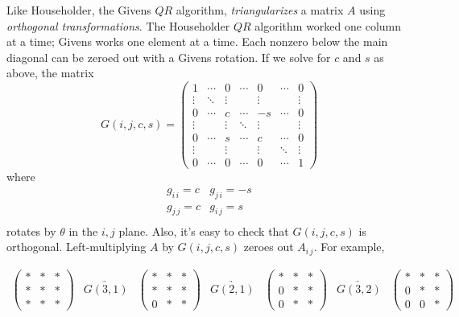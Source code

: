 Like Householder, the Givens $QR$ algorithm, \emph{triangularizes} a matrix $A$ using \emph{orthogonal transformations}.
The Householder $QR$ algorithm worked one column at a time; Givens works one element at a time.
Each nonzero below the main diagonal can be zeroed out with a Givens rotation.
If we solve for $c$ and $s$ as above, the matrix
\begin{equation*}
G(i,j,c,s) = 
\begin{pmatrix}
1   & \cdots & 0 & \cdots & 0 & \cdots & 0 \\
 \vdots & \ddots & \vdots &  & \vdots & & \vdots \\
0   & \cdots &    c   & \cdots &    -s   & \cdots &    0   \\
 \vdots &        & \vdots & \ddots & \vdots &        & \vdots \\
 0   & \cdots &   s   & \cdots &    c   & \cdots &    0   \\
\vdots &        & \vdots &        & \vdots & \ddots & \vdots \\
0   & \cdots &    0   & \cdots &    0   & \cdots &    1 
\end{pmatrix}
\end{equation*}
where
\[ \begin{array}{ll}
g_{i\, i} = c  & g_{j\, i}= -s   \\
g_{j\, j} = c &  g_{i\, j}= s  \\
\end{array}\]
rotates by $\theta$ in the $i,j$ plane.
Also, it's easy to check that $G(i,j,c,s)$ is orthogonal.
Left-multiplying $A$ by $G(i,j,c,s)$ zeroes out $A_{i\, j}$.
For example, 

\[
\begin{array}{ccccccc}
\begin{pmatrix}
*&*&*\\
*&*&*\\
*&*&*
\end{pmatrix}
&
\underrightarrow{G(3,1)}
&\begin{pmatrix}
*&*&*\\
*&*&*\\
0&*&*
\end{pmatrix}
&
\underrightarrow{G(2,1)}
&\begin{pmatrix}
*&*&*\\
0&*&*\\
0&*&*
\end{pmatrix}
&
\underrightarrow{G(3,2)}
&\begin{pmatrix}
*&*&*\\
0&*&*\\
0&0&*
\end{pmatrix}
\end{array}
\]

